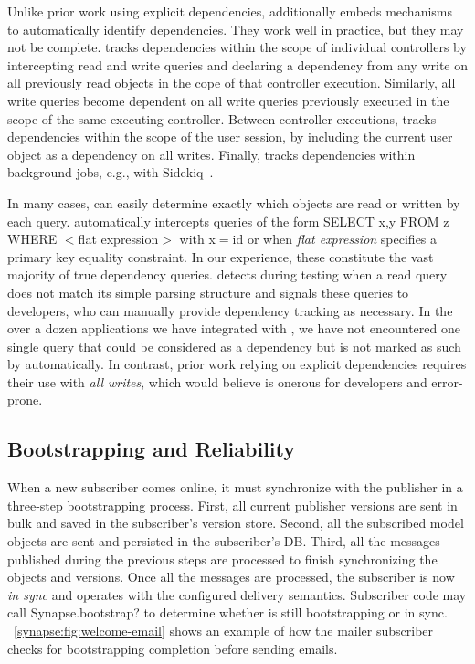 Unlike prior work using explicit dependencies, \synapse additionally embeds
mechanisms to automatically identify dependencies.  They work well in
practice, but they may not be complete.  \synapse tracks dependencies
within the scope of individual controllers by intercepting read and write
queries and declaring a dependency from any write on all previously read objects
in the cope of that controller execution.  Similarly, all write queries
become dependent on all write queries previously executed in the scope of the
same executing controller. Between controller executions, \synapse tracks
dependencies within the scope of the user session, by including the current user
object as a dependency on all writes.  Finally, \synapse tracks dependencies
within background jobs, e.g., with Sidekiq~\cite{sidekiq}.

In many cases, \synapse can easily determine exactly which objects are read
or written by each query. \synapse automatically intercepts queries of the
form { \code SELECT x,y FROM z WHERE $<$flat expression$>$} with {\code x$=$id}
or when {\em flat expression} specifies a primary key equality constraint.
In our experience, these constitute the vast majority of true dependency
queries.  \synapse detects during testing when a read query does not match its
simple parsing structure and signals these queries to developers, who can
manually provide dependency tracking as necessary.  In the over a dozen
applications we have integrated with \synapse, we have not encountered one
single query that could be considered as a dependency but is not marked as such
by \synapse automatically.  In contrast, prior work relying on explicit
dependencies requires their use with {\em all writes}, which would believe is
onerous for developers and error-prone.

\subsection{Bootstrapping and Reliability} \label{synapse:sec:arch:bootstrapping}

When a new subscriber comes online, it must synchronize with the publisher in a
three-step bootstrapping process. First, all current publisher versions are sent
in bulk and saved in the subscriber's version store. Second, all the subscribed model
objects are sent and persisted in the subscriber's DB. Third, all the messages
published during the previous steps are processed to finish synchronizing the
objects and versions. Once all the messages are processed, the subscriber is now
{\em in sync} and operates with the configured delivery semantics.
Subscriber code may call {\code Synapse.bootstrap?} to determine whether \synapse
is still bootstrapping or in sync. \F~\ref{synapse:fig:welcome-email} shows an example of
how the mailer subscriber checks for bootstrapping completion before sending emails.

